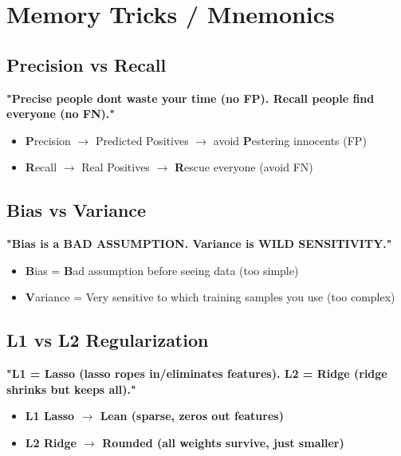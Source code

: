 \documentclass[11pt]{article}
\providecommand{\tightlist}{\setlength{\itemsep}{1pt}\setlength{\parskip}{0pt}}
\begin{document}
\section{Memory Tricks / Mnemonics}\label{memory-tricks--mnemonics}

\subsection{Precision vs Recall}\label{precision-vs-recall}

\textbf{"Precise people don\textquotesingle t waste your time (no FP). Recall people find everyone (no FN)."}

\begin{itemize}
\tightlist
\item
  \textbf{P}recision \(\rightarrow\) Predicted Positives \(\rightarrow\) avoid \textbf{P}estering innocents (FP)
\item
  \textbf{R}ecall \(\rightarrow\) Real Positives \(\rightarrow\) \textbf{R}escue everyone (avoid FN)
\end{itemize}

\subsection{Bias vs Variance}\label{bias-vs-variance}

\textbf{"Bias is a BAD ASSUMPTION. Variance is WILD SENSITIVITY."}

\begin{itemize}
\tightlist
\item
  \textbf{B}ias = \textbf{B}ad assumption before seeing data (too simple)
\item
  \textbf{V}ariance = Very sensitive to which training samples you use (too complex)
\end{itemize}

\subsection{L1 vs L2 Regularization}\label{l1-vs-l2-regularization}

\textbf{"L1 = Lasso (lasso ropes in/eliminates features). L2 = Ridge (ridge shrinks but keeps all)."}

\begin{itemize}
\tightlist
\item
  \textbf{L1 Lasso \(\rightarrow\) Lean (sparse, zeros out features)}
\item
  \textbf{L2 Ridge \(\rightarrow\) Rounded (all weights survive, just smaller)}
\end{itemize}
\end{document}

